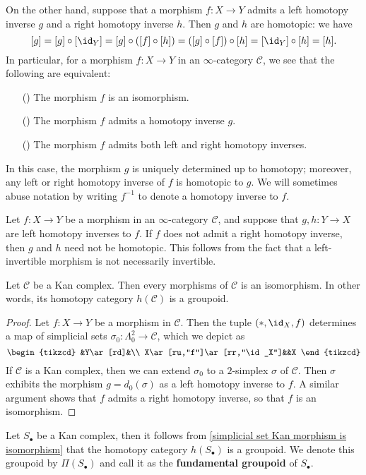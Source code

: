 On the other hand, suppose that a morphism $f:X\to Y$ admits a left homotopy inverse $g$ and a right homotopy inverse $h$. Then $g$ and $h$ are homotopic: we have
\[[g]=[g]\circ[\id_Y]=[g]\circ([f]\circ[h])=([g]\circ[f])\circ[h]=[\id_Y]\circ[h]=[h].\]
In particular, for a morphism $f:X\to Y$ in an $\infty$-category $\mathcal{C}$, we see that the following are equivalent:
\begin{itemize}
\item[(\rmnum{1})] The morphism $f$ is an isomorphism.
\item[(\rmnum{2})] The morphism $f$ admits a homotopy inverse $g$.
\item[(\rmnum{3})] The morphism $f$ admits both left and right homotopy inverses.
\end{itemize}
In this case, the morphism $g$ is uniquely determined up to homotopy; moreover, any left or right homotopy inverse of $f$ is homotopic to $g$. We will sometimes abuse notation by writing $f^{-1}$ to denote a homotopy inverse to $f$.
\begin{remark}
Let $f:X\to Y$ be a morphism in an $\infty$-category $\mathcal{C}$, and suppose that $g,h:Y\to X$ are left homotopy inverses to $f$. If $f$ does not admit a right homotopy inverse, then $g$ and $h$ need not be homotopic. This follows from the fact that a left-invertible morphism is not necessarily invertible.
\end{remark}
\begin{proposition}\label{simplicial set Kan morphism is isomorphism}
Let $\mathcal{C}$ be a Kan complex. Then every morphisms of $\mathcal{C}$ is an isomorphism. In other words, its homotopy category $h(\mathcal{C})$ is a groupoid.
\end{proposition}
\begin{proof}
Let $f:X\to Y$ be a morphism in $\mathcal{C}$. Then the tuple $(\ast,\id_X,f)$ determines a map of simplicial sets $\sigma_0:\Lambda^2_0\to\mathcal{C}$, which we depict as
\[\begin{tikzcd}
&Y\ar[rd]&\\
X\ar[ru,"f"]\ar[rr,"\id_X"]&&X
\end{tikzcd}\]
If $\mathcal{C}$ is a Kan complex, then we can extend $\sigma_0$ to a $2$-simplex $\sigma$ of $\mathcal{C}$. Then $\sigma$ exhibits the morphism $g=d_0(\sigma)$ as a left homotopy inverse to $f$. A similar argument shows that $f$ admits a right homotopy inverse, so that $f$ is an isomorphism.
\end{proof}
Let $S_\bullet$ be a Kan complex, then it follows from \cref{simplicial set Kan morphism is isomorphism} that the homotopy category $h(S_\bullet)$ is a groupoid. We denote this groupoid by $\Pi(S_\bullet)$ and call it as the \textbf{fundamental groupoid} of $S_\bullet$.
